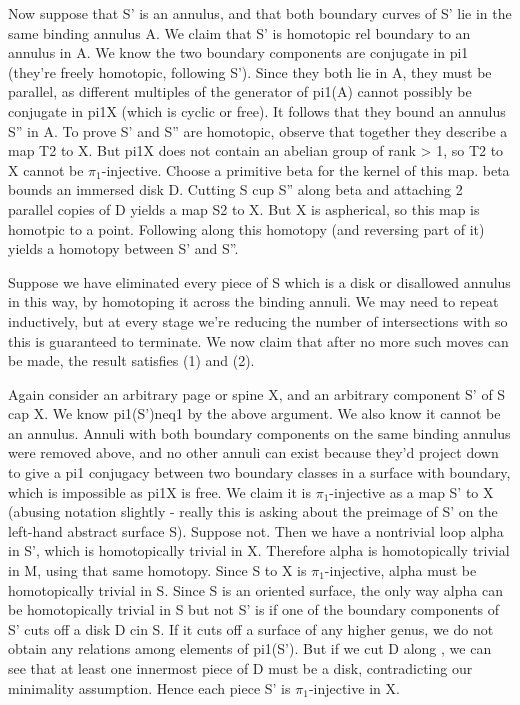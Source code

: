 Now suppose that S' is an annulus, and that both boundary curves of S' lie in
the same binding annulus A. We claim that S' is homotopic rel boundary to an
annulus in A. We know the two boundary components are conjugate in pi1 (they're
freely homotopic, following S'). Since they both lie in A, they must be
parallel, as different multiples of the generator of pi1(A) cannot possibly be
conjugate in pi1X (which is cyclic or free). It follows that they bound an
annulus S'' in A.  To prove S' and S'' are homotopic, observe that together
they describe a map T2 to X. But pi1X does not contain an abelian group of rank
> 1, so T2 to X cannot be $\pi_1$-injective. Choose a primitive beta for the kernel
of this map.  beta bounds an immersed disk D. Cutting S cup S'' along beta and
attaching 2 parallel copies of D yields a map S2 to X. But X is aspherical, so
this map is homotpic to a point. Following along this homotopy (and reversing
part of it) yields a homotopy between S' and S''.

Suppose we have eliminated every piece of S which is a disk or disallowed
annulus in this way, by homotoping it across the binding annuli. We may need to
repeat inductively, but at every stage we're reducing the number of
intersections with \cA so this is guaranteed to terminate. We now claim that
after no more such moves can be made, the result satisfies (1) and (2).

Again consider an arbitrary page or spine X, and an arbitrary component S' of
S cap X.  We know pi1(S')neq1 by the above argument. We also know it cannot be
an annulus. Annuli with both boundary components on the same binding annulus
were removed above, and no other annuli can exist because they'd project down
to give a pi1 conjugacy between two boundary classes in a surface with
boundary, which is impossible as pi1X is free. We claim it is $\pi_1$-injective as
a map S' to X (abusing notation slightly - really this is asking about the
preimage of S' on the left-hand abstract surface S).  Suppose not. Then we have
a nontrivial loop alpha in S', which is homotopically trivial in X.  Therefore
alpha is homotopically trivial in M, using that same homotopy.  Since S to X is
$\pi_1$-injective, alpha must be homotopically trivial in S. Since S is an oriented
surface, the only way alpha can be homotopically trivial in S but not S' is if
one of the boundary components of S' cuts off a disk D cin S. If it cuts off
a surface of any higher genus, we do not obtain any relations among elements of
pi1(S'). But if we cut D along \cA, we can see that at least one innermost piece
of D must be a disk, contradicting our minimality assumption. Hence each piece
S' is $\pi_1$-injective in X.

